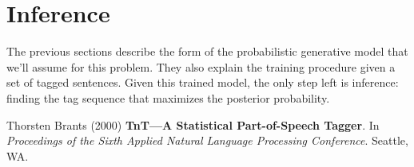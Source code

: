 \documentclass[11pt]{article}
\begin{document}
\section{Inference}

The previous sections describe the form of the probabilistic generative model
that we'll assume for this problem.
They also explain the training procedure given a set of tagged sentences.
Given this trained model, the only step left is inference: finding the tag
sequence that maximizes the posterior probability.


\begin{thebibliography}{}\raggedright

 Thorsten Brants (2000)
\textbf{TnT---A Statistical Part-of-Speech Tagger}.
In \emph{Proceedings of the Sixth Applied Natural Language Processing
Conference}. Seattle, WA.

\end{thebibliography}
\end{document}
